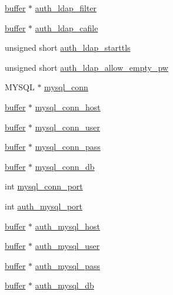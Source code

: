 \begin{DoxyCompactItemize}
\item 
\hyperlink{structbuffer}{buffer} $\ast$ \hyperlink{structplugin__config_ada10c83dc0b92eafedb358392d279af5}{auth\-\_\-ldap\-\_\-filter}
\item 
\hyperlink{structbuffer}{buffer} $\ast$ \hyperlink{structplugin__config_aa52340515c657d0e7c213f8395e747b3}{auth\-\_\-ldap\-\_\-cafile}
\item 
unsigned short \hyperlink{structplugin__config_a6ac81bd64ae70f9c242444e7ad47682a}{auth\-\_\-ldap\-\_\-starttls}
\item 
unsigned short \hyperlink{structplugin__config_a60843f9797c3e38e5ad89d9d899095fe}{auth\-\_\-ldap\-\_\-allow\-\_\-empty\-\_\-pw}
\item 
M\-Y\-S\-Q\-L $\ast$ \hyperlink{structplugin__config_aa03fa38a977ee3a43df127dd73d01ec2}{mysql\-\_\-conn}
\item 
\hyperlink{structbuffer}{buffer} $\ast$ \hyperlink{structplugin__config_a01d542944d79302362c000102d9e7e9d}{mysql\-\_\-conn\-\_\-host}
\item 
\hyperlink{structbuffer}{buffer} $\ast$ \hyperlink{structplugin__config_a940cddc3f8dda1c9c126df2ff02b6daf}{mysql\-\_\-conn\-\_\-user}
\item 
\hyperlink{structbuffer}{buffer} $\ast$ \hyperlink{structplugin__config_a5d14d694b2e06adf104ba0bdd6f33c5b}{mysql\-\_\-conn\-\_\-pass}
\item 
\hyperlink{structbuffer}{buffer} $\ast$ \hyperlink{structplugin__config_a529cf511ec42c8512cb03004e5b4d3fe}{mysql\-\_\-conn\-\_\-db}
\item 
int \hyperlink{structplugin__config_a8c0053d52a26b46b3db5a01351917b6e}{mysql\-\_\-conn\-\_\-port}
\item 
int \hyperlink{structplugin__config_a72b2a6c4b315c3ea2c9b65c87863ad19}{auth\-\_\-mysql\-\_\-port}
\item 
\hyperlink{structbuffer}{buffer} $\ast$ \hyperlink{structplugin__config_ab8f1edb0955981b20739edb402a32e21}{auth\-\_\-mysql\-\_\-host}
\item 
\hyperlink{structbuffer}{buffer} $\ast$ \hyperlink{structplugin__config_a6e4ad8a4887419e898e7527d100e7903}{auth\-\_\-mysql\-\_\-user}
\item 
\hyperlink{structbuffer}{buffer} $\ast$ \hyperlink{structplugin__config_abd6a87b36db03248610fd0cb3bb7032e}{auth\-\_\-mysql\-\_\-pass}
\item 
\hyperlink{structbuffer}{buffer} $\ast$ \hyperlink{structplugin__config_a366eb3774ef10a05c08758b75eb76708}{auth\-\_\-mysql\-\_\-db}
\item 

\end{DoxyCompactItemize}
